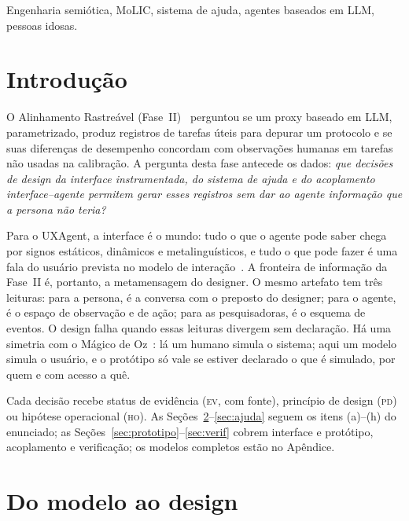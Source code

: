 \documentclass[conference]{IEEEtran}
\newcommand{\stEV}{\textsc{ev}}
\newcommand{\stPD}{\textsc{pd}}
\newcommand{\stHO}{\textsc{ho}}
\begin{document}
\begin{IEEEkeywords}
Engenharia semiótica, MoLIC, sistema de ajuda, agentes baseados em LLM, pessoas idosas.
\end{IEEEkeywords}

\section{Introdução}

O Alinhamento Rastreável (Fase~II)~\cite{lacerda2026faseII} perguntou se um proxy baseado em LLM, parametrizado, produz registros de tarefas úteis para depurar um protocolo e se suas diferenças de desempenho concordam com observações humanas em tarefas não usadas na calibração. A pergunta desta fase antecede os dados: \textit{que decisões de design da interface instrumentada, do sistema de ajuda e do acoplamento interface--agente permitem gerar esses registros sem dar ao agente informação que a persona não teria?}~\cite{lara2026a3}

Para o UXAgent, a interface é o mundo: tudo o que o agente pode saber chega por signos estáticos, dinâmicos e metalinguísticos, e tudo o que pode fazer é uma fala do usuário prevista no modelo de interação~\cite{barbosa2010}. A fronteira de informação da Fase~II é, portanto, a metamensagem do designer. O mesmo artefato tem três leituras: para a persona, é a conversa com o preposto do designer; para o agente, é o espaço de observação e de ação; para as pesquisadoras, é o esquema de eventos. O design falha quando essas leituras divergem sem declaração. Há uma simetria com o Mágico de Oz~\cite{preece2002}: lá um humano simula o sistema; aqui um modelo simula o usuário, e o protótipo só vale se estiver declarado o que é simulado, por quem e com acesso a quê.

Cada decisão recebe status de evidência (\stEV, com fonte), princípio de design (\stPD) ou hipótese operacional (\stHO). As Seções~\ref{sec:modelo}--\ref{sec:ajuda} seguem os itens (a)--(h) do enunciado; as Seções~\ref{sec:prototipo}--\ref{sec:verif} cobrem interface e protótipo, acoplamento e verificação; os modelos completos estão no Apêndice.

\section{Do modelo ao design}\label{sec:modelo}
\end{document}
